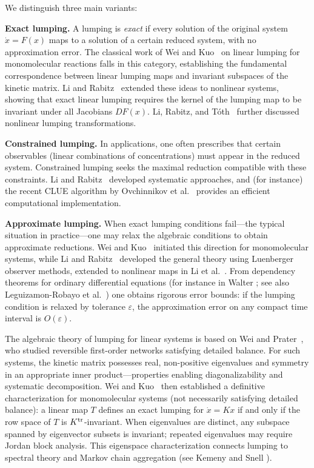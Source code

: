 \documentclass{article}
\begin{document}
 We distinguish 
three main variants:

\medskip
\noindent\textbf{Exact lumping.} 
A lumping is \emph{exact} if every solution of the original system $\dot x=F(x)$
maps to a solution of a certain reduced system, with no approximation error. The classical work of 
Wei and Kuo~\cite{WK1969a} on linear lumping for monomolecular reactions falls in this 
category, establishing the fundamental correspondence between linear lumping maps and 
invariant subspaces of the kinetic matrix. Li and Rabitz~\cite{LR1989} extended these ideas 
to nonlinear systems, showing that exact linear lumping requires the kernel of the lumping 
map to be invariant under all Jacobians $DF(x)$. Li, Rabitz, and T\'oth~\cite{LRT1994} further 
discussed nonlinear lumping transformations.

\medskip
\noindent\textbf{Constrained lumping.} 
In applications, one often prescribes that certain 
observables (linear combinations of concentrations) must appear in the reduced system. 
Constrained lumping seeks the maximal reduction compatible with these constraints. 
Li and Rabitz~\cite{LR1991a,LR1991b} developed systematic approaches, and (for instance) the recent CLUE 
algorithm by Ovchinnikov et al.~\cite{OVPT2021} provides an efficient computational 
implementation.

\medskip
\noindent\textbf{Approximate lumping.} 
When exact lumping conditions fail---the typical situation 
in practice---one may relax the algebraic conditions to obtain approximate reductions. 
Wei and Kuo~\cite{WK1969b} initiated this direction for monomolecular systems, while 
Li and Rabitz~\cite{LR1990} developed the general theory using Luenberger observer methods, 
extended to nonlinear maps in Li et al.\ \cite{LTRT1994}. From dependency theorems for ordinary differential equations (for instance in Walter \cite{Walter1998}; see also 
Leguizamon-Robayo et al.~\cite{LJTTV}) one obtains rigorous error bounds: if 
the lumping condition is relaxed by tolerance $\varepsilon$, the approximation error on any compact time interval is 
$O(\varepsilon)$. 

The algebraic theory of lumping for linear systems is based on Wei and Prater~\cite{WP1962}, who studied 
reversible first-order networks satisfying detailed balance. For such systems, the kinetic 
matrix possesses real, non-positive eigenvalues and symmetry in an appropriate inner 
product---properties enabling diagonalizability and systematic decomposition. Wei and Kuo~\cite{WK1969a} then 
established a definitive characterization for monomolecular systems (not necessarily satisfying detailed balance): a linear map $T$ 
defines an exact lumping for $\dot{x} = Kx$ if and only if the row space of $T$ is 
$K^{\rm tr}$-invariant. When eigenvalues are distinct, any subspace spanned by eigenvector subsets 
is invariant; repeated eigenvalues may require Jordan block analysis. This eigenspace 
characterization connects lumping to spectral theory and Markov chain 
aggregation (see Kemeny and Snell \cite{KeSn1960}).
\end{document}
